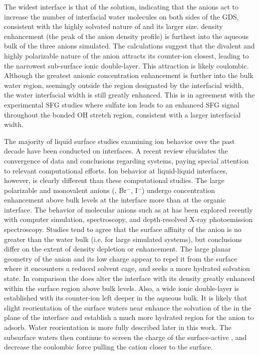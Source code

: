 The widest interface is that of the \sodsul solution, indicating that the \sul anions act to increase the number of interfacial water molecules on both sides of the GDS, consistent with the highly solvated nature of \sul and its larger size. \sul density enhancement (the peak of the anion density profile) is furthest into the aqueous bulk of the three anions simulated. The calculations suggest that the divalent and highly polarizable nature of the \sul anion attracts its counter-ion closest, leading to the narrowest sub-surface ionic double-layer. This attraction is likely coulombic. Although the greatest anionic concentration enhancement is further into the bulk water region, seemingly outside the region designated by the interfacial width, the water interfacial width is still greatly enhanced. This is in agreement with the experimental \sodsul SFG studies where sulfate ion leads to an enhanced SFG signal throughout the bonded OH stretch region, consistent with a larger interfacial width.\cite{McFearin2009}

The majority of liquid surface studies examining ion behavior over the past decade have been conducted on \airwat interfaces. A recent review elucidates the convergence of data and conclusions regarding \airwat systems, paying special attention to relevant computational efforts.\cite{Jungwirth2006a} Ion behavior at liquid-liquid interfaces, however, is clearly different than these \airwat computational studies. The large polarizable and monovalent anions (\cl, Br$^-$, I$^-$) undergo concentration enhancement above bulk levels at the \airwat interface more than at the organic interface.\cite{Wick2006c,Wick2007a} The behavior of molecular anions such as \nit at \airwat has been explored recently with computer simulation,\cite{Thomas2007,Miller2009} spectroscopy,\cite{Soule2007,Xu2009,Otten2007} and depth-resolved X-ray photoemission spectroscopy.\cite{Brown2009} Studies tend to agree that the \airwat surface affinity of the \nit anion is no greater than the water bulk (i.e. for large simulated systems), but conclusions differ on the extent of density depletion or enhancement. The large planar geometry of the \nit anion and its low charge appear to repel it from the \airwat surface where it encounters a reduced solvent cage, and seeks a more hydrated solvation state. In comparison the \nit does alter the \ctcwat interface with its density greatly enhanced within the surface region above bulk levels. Also, a wide ionic double-layer is established with its counter-ion left deeper in the aqueous bulk. It is likely that slight reorientation of the surface waters near \ctc enhance the solvation of the \nit in the plane of the interface and establish a much more hydrated region for the anion to adsorb. Water reorientation is more fully described later in this work. The subsurface waters then continue to screen the charge of the surface-active \nit, and decrease the coulombic force pulling the cation closer to the surface. 

